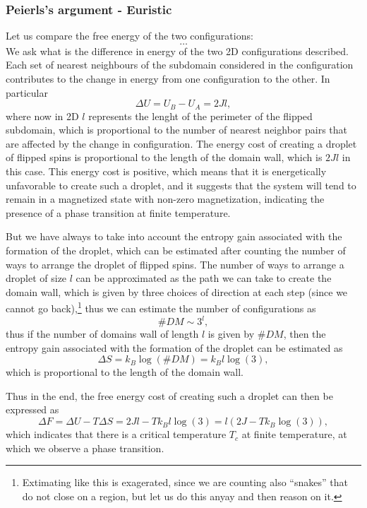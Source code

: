 \subsubsection{Peierls's argument - Euristic}

Let us compare the free energy of the two configurations:
\[
    \dots
\]
We ask what is the difference in energy of the two 2D configurations described. Each set of nearest neighbours of the subdomain considered in the configuration contributes to the change in energy from one configuration to the other. In particular
\[
    \Delta U = U_B - U_A = 2 J l,
\]
where now in 2D \(l\) represents the lenght of the perimeter of the flipped subdomain, which is proportional to the number of nearest neighbor pairs that are affected by the change in configuration. The energy cost of creating a droplet of flipped spins is proportional to the length of the domain wall, which is \(2 J l\) in this case. This energy cost is positive, which means that it is energetically unfavorable to create such a droplet, and it suggests that the system will tend to remain in a magnetized state with non-zero magnetization, indicating the presence of a phase transition at finite temperature.

But we have always to take into account the entropy gain associated with the formation of the droplet, which can be estimated after counting the number of ways to arrange the droplet of flipped spins. The number of ways to arrange a droplet of size \(l\) can be approximated as the path we can take to create the domain wall, which is given by three choices of direction at each step (since we cannot go back),\footnote{Extimating like this is exagerated, since we are counting also ``snakes'' that do not close on a region, but let us do this anyay and then reason on it.} thus we can estimate the number of configurations as
\[
    \# DM \sim 3^l,
\]
thus if the number of domains wall of length \(l\) is given by \(\# DM\), then the entropy gain associated with the formation of the droplet can be estimated as
\[
    \Delta S = k_B \log(\# DM) = k_B l \log(3),
\]
which is proportional to the length of the domain wall.

Thus in the end, the free energy cost of creating such a droplet can then be expressed as
\[
    \Delta F = \Delta U - T \Delta S = 2 J l - T k_B l \log(3) = l (2 J - T k_B \log(3)),
\]
which indicates that there is a critical temperature \(T_c\) at finite temperature, at which we observe a phase transition.

